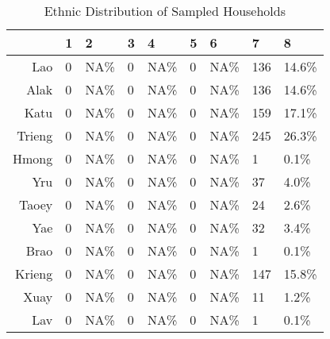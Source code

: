\begin{table}[ht]
\centering
\begin{tabular}{rllllllll}
  \hline
 & 1 & 2 & 3 & 4 & 5 & 6 & 7 & 8 \\ 
  \hline
Lao & 0 & NA\% & 0 & NA\% & 0 & NA\% & 136 & 14.6\% \\ 
  Alak & 0 & NA\% & 0 & NA\% & 0 & NA\% & 136 & 14.6\% \\ 
  Katu & 0 & NA\% & 0 & NA\% & 0 & NA\% & 159 & 17.1\% \\ 
  Trieng & 0 & NA\% & 0 & NA\% & 0 & NA\% & 245 & 26.3\% \\ 
  Hmong & 0 & NA\% & 0 & NA\% & 0 & NA\% & 1 & 0.1\% \\ 
  Yru & 0 & NA\% & 0 & NA\% & 0 & NA\% & 37 & 4.0\% \\ 
  Taoey & 0 & NA\% & 0 & NA\% & 0 & NA\% & 24 & 2.6\% \\ 
  Yae & 0 & NA\% & 0 & NA\% & 0 & NA\% & 32 & 3.4\% \\ 
  Brao & 0 & NA\% & 0 & NA\% & 0 & NA\% & 1 & 0.1\% \\ 
  Krieng & 0 & NA\% & 0 & NA\% & 0 & NA\% & 147 & 15.8\% \\ 
  Xuay & 0 & NA\% & 0 & NA\% & 0 & NA\% & 11 & 1.2\% \\ 
  Lav & 0 & NA\% & 0 & NA\% & 0 & NA\% & 1 & 0.1\% \\ 
   \hline
\end{tabular}
\caption{Ethnic Distribution of Sampled Households} 
\end{table}
